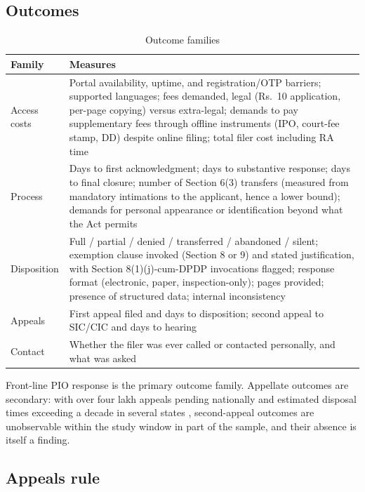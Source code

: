 \documentclass[11pt]{article}
\begin{document}
\subsection{Outcomes}
\label{sec:outcomes}

\begin{table}[htbp]
\centering
\caption{Outcome families}
\label{tab:outcomes}
\small
\begin{tabularx}{\textwidth}{lL}
\toprule
Family & Measures \\
\midrule
Access costs & Portal availability, uptime, and registration/OTP barriers; supported languages; fees demanded, legal (Rs.\ 10 application, per-page copying) versus extra-legal; demands to pay supplementary fees through offline instruments (IPO, court-fee stamp, DD) despite online filing; total filer cost including RA time \\
\addlinespace
Process & Days to first acknowledgment; days to substantive response; days to final closure; number of Section 6(3) transfers (measured from mandatory intimations to the applicant, hence a lower bound); demands for personal appearance or identification beyond what the Act permits \\
\addlinespace
Disposition & Full / partial / denied / transferred / abandoned / silent; exemption clause invoked (Section 8 or 9) and stated justification, with Section 8(1)(j)-cum-DPDP invocations flagged; response format (electronic, paper, inspection-only); pages provided; presence of structured data; internal inconsistency \\
\addlinespace
Appeals & First appeal filed and days to disposition; second appeal to SIC/CIC and days to hearing \\
\addlinespace
Contact & Whether the filer was ever called or contacted personally, and what was asked \\
\bottomrule
\end{tabularx}
\end{table}

Front-line PIO response is the primary outcome family. Appellate outcomes are secondary: with over four lakh appeals pending nationally and estimated disposal times exceeding a decade in several states \citep{sns2025}, second-appeal outcomes are unobservable within the study window in part of the sample, and their absence is itself a finding.

\subsection{Appeals rule}
\label{sec:appeals}
\end{document}
